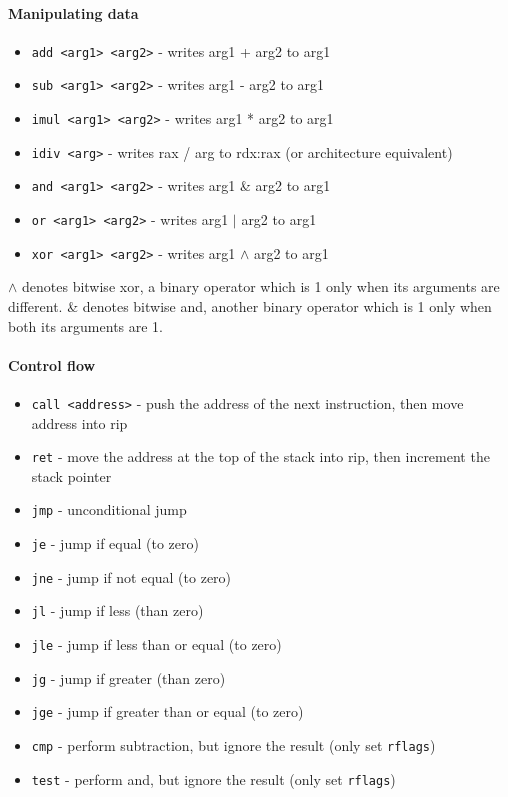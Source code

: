 \documentclass{article}
\newenvironment{aside}
    {\begin{mdframed}[style=0,%
        leftline=false,rightline=false,leftmargin=2em,rightmargin=2em,%
            innerleftmargin=0pt,innerrightmargin=0pt,linewidth=0.75pt,%
        skipabove=7pt,skipbelow=7pt]\small}
    {\end{mdframed}
}
\begin{document}
\paragraph{Manipulating data}
\begin{itemize}
    \item \texttt{add <arg1> <arg2>} - writes arg1 + arg2 to arg1
    \item \texttt{sub <arg1> <arg2>} - writes arg1 - arg2 to arg1
    \item \texttt{imul <arg1> <arg2>} - writes arg1 * arg2 to arg1
    \item \texttt{idiv <arg>} - writes rax / arg to rdx:rax (or architecture
        equivalent)
    \item \texttt{and <arg1> <arg2>} - writes arg1 \& arg2 to arg1
    \item \texttt{or <arg1> <arg2>} - writes arg1 $|$ arg2 to arg1
    \item \texttt{xor <arg1> <arg2>} - writes arg1 $\wedge$ arg2 to arg1
\end{itemize}

\begin{aside}
    $\wedge$ denotes bitwise xor, a binary operator which is 1 only when its
    arguments are different. \& denotes bitwise and, another binary operator
    which is 1 only when both its arguments are 1.
\end{aside}

\paragraph{Control flow}
\begin{itemize}
    \item \texttt{call <address>} - push the address of the next instruction,
        then move address into rip
    \item \texttt{ret} - move the address at the top of the stack into rip,
        then increment the stack pointer
    \item \texttt{jmp} - unconditional jump
    \item \texttt{je} - jump if equal (to zero)
    \item \texttt{jne} - jump if not equal (to zero)
    \item \texttt{jl} - jump if less (than zero)
    \item \texttt{jle} - jump if less than or equal (to zero)
    \item \texttt{jg} - jump if greater (than zero)
    \item \texttt{jge} - jump if greater than or equal (to zero)
    \item \texttt{cmp} - perform subtraction, but ignore the result (only set
        \texttt{rflags})
    \item \texttt{test} - perform and, but ignore the result (only set
        \texttt{rflags})
\end{itemize}
\end{document}
